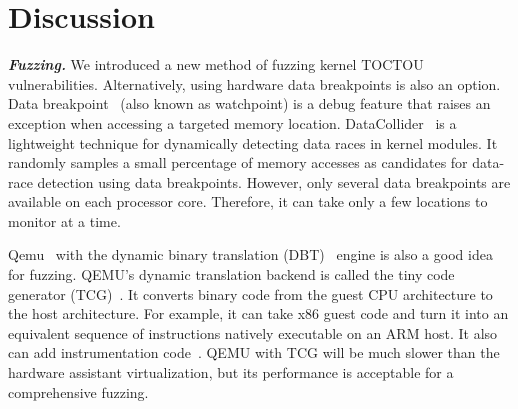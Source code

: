 
\section{Discussion}
\label{sec:ktoctou-discussion}

\textbf{\textit{Fuzzing.}} We introduced a new method of fuzzing kernel TOCTOU vulnerabilities. Alternatively, using hardware data breakpoints is also an option. Data breakpoint~\cite{krishnan2009hardware} (also known as watchpoint) is a debug feature that raises an exception when accessing a targeted memory location.  DataCollider~\cite{krishnan2009hardware} is a lightweight technique for dynamically detecting data races in kernel modules. It randomly samples a small percentage of memory accesses as candidates for data-race detection using data breakpoints. However, only several data breakpoints are available on each processor core. Therefore, it can take only a few locations to monitor at a time.


Qemu~\cite{bellard2005qemu} with the dynamic binary translation (DBT)~\cite{ebcioglu2001dynamic} engine is also a good idea for fuzzing. QEMU's dynamic translation backend is called the tiny code generator (TCG)~\cite{bellard2005qemu}.  It converts binary code from the guest CPU architecture to the host architecture. For example, it can take x86 guest code and turn it into an equivalent sequence of instructions natively executable on an ARM host. It also can add instrumentation code~\cite{quynh2015unicorn}. QEMU with TCG will be much slower than the hardware assistant virtualization, but its performance is acceptable for a comprehensive fuzzing.




